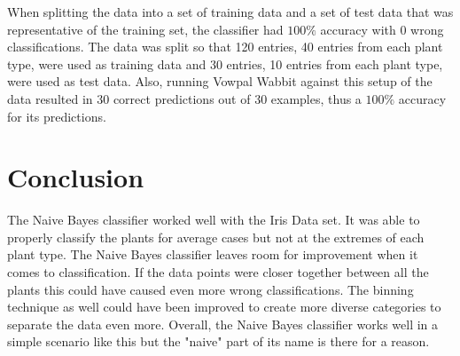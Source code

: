 \documentclass{article}
\begin{document}
\quad When splitting the data into a set of training data and a set of test data that was representative of the training set, the classifier had $100\%$ accuracy with 0 wrong classifications. The data was split so that 120 entries, 40 entries from each plant type, were used as training data and 30 entries, 10 entries from each plant type, were used as test data. Also, running Vowpal Wabbit against this setup of the data resulted in 30 correct predictions out of 30 examples, thus a $100\%$ accuracy for its predictions.

\section{Conclusion}
\quad The Naive Bayes classifier worked well with the Iris Data set. It was able to properly classify the plants for average cases but not at the extremes of each plant type. The Naive Bayes classifier leaves room for improvement when it comes to classification. If the data points were closer together between all the plants this could have caused even more wrong classifications. The binning technique as well could have been improved to create more diverse categories to separate the data even more. Overall, the Naive Bayes classifier works well in a simple scenario like this but the "naive" part of its name is there for a reason.
\end{document}
